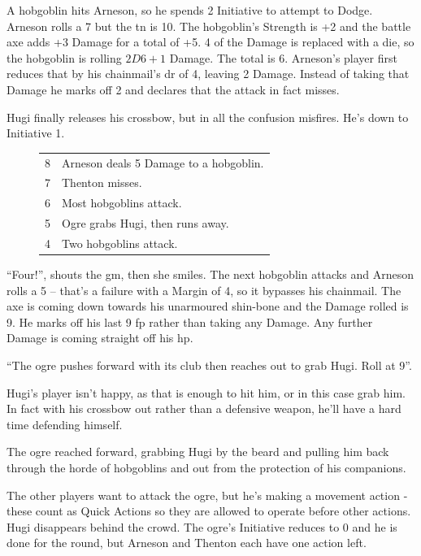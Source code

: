 \begin{multicols}{2}
{\begin{exampletext}
	A hobgoblin hits Arneson, so he spends 2 Initiative to attempt to Dodge. Arneson rolls a 7 but the \gls{tn} is 10.
	The hobgoblin's Strength is +2 and the battle axe adds +3 Damage for a total of +5.
	4 of the Damage is replaced with a die, so the hobgoblin is rolling $2D6+1$ Damage.
	The total is 6.
	Arneson's player first reduces that by his chainmail's \gls{dr} of 4, leaving 2 Damage.
	Instead of taking that Damage he marks off 2  and declares that the attack in fact misses.

	Hugi finally releases his crossbow, but in all the confusion misfires. He's down to Initiative 1.

		\needspace{3cm}
		\begin{figure}

			\begin{tabularx}{.3\textwidth}{c|X}
				\setcounter{enc}{12}

				8 & Arneson deals 5 Damage to a hobgoblin. \\

				7 & Thenton misses. \\

				6 & Most hobgoblins attack. \\

				5 & Ogre grabs Hugi, then runs away. \\
				4 & Two hobgoblins attack. \\


			\end{tabularx}

		\end{figure}

	``Four!'', shouts the \gls{gm}, then she smiles. The next hobgoblin attacks and Arneson rolls a 5 -- that's a failure with a Margin of 4, so it bypasses his chainmail. The axe is coming down towards his unarmoured shin-bone and the Damage rolled is 9. He marks off his last 9 \gls{fp} rather than taking any Damage. Any further Damage is coming straight off his \gls{hp}.

	``The ogre pushes forward with its club then reaches out to grab Hugi. Roll at  9''.

	Hugi's player isn't happy, as that is enough to hit him, or in this case grab him. In fact with his crossbow out rather than a defensive weapon, he'll have a hard time defending himself.

	The ogre reached forward, grabbing Hugi by the beard and pulling him back through the horde of hobgoblins and out from the protection of his companions.

	The other players want to attack the ogre, but he's making a movement action - these count as Quick Actions so they are allowed to operate before other actions.
	Hugi disappears behind the crowd.
	The ogre's Initiative reduces to 0 and he is done for the \gls{round}, but Arneson and Thenton each have one action left.

\end{exampletext}

}{}

\end{multicols}


